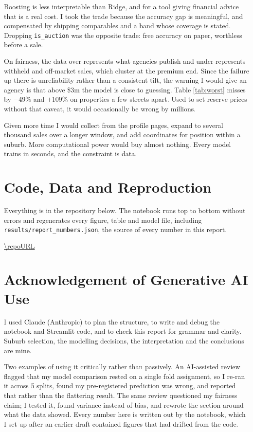 \documentclass[12pt,a4paper]{article}
\begin{document}
Boosting is less interpretable than Ridge, and for a tool giving financial advice that is a real
cost. I took the trade because the accuracy gap is meaningful, and compensated by shipping
comparables and a band whose coverage is stated. Dropping \texttt{is\_auction} was the opposite
trade: free accuracy on paper, worthless before a sale.

On fairness, the data over-represents what agencies publish and under-represents withheld and
off-market sales, which cluster at the premium end. Since the failure up there is unreliability
rather than a consistent tilt, the warning I would give an agency is that above \$3m the model is
close to guessing. Table \ref{tab:worst} misses by $-$49\% and $+$109\% on properties a few
streets apart. Used to set reserve prices without that caveat, it would occasionally be wrong by
millions.

Given more time I would collect from the profile pages, expand to several thousand sales over a
longer window, and add coordinates for position within a suburb. More computational power would
buy almost nothing. Every model trains in seconds, and the constraint is data.

\section{Code, Data and Reproduction}

Everything is in the repository below. The notebook runs top to bottom without errors and
regenerates every figure, table and model file, including
\texttt{results/report\_numbers.json}, the source of every number in this report.

\begin{center}
\url{\repoURL}
\end{center}

\section{Acknowledgement of Generative AI Use}

I used Claude (Anthropic) to plan the structure, to write and debug the notebook and Streamlit
code, and to check this report for grammar and clarity. Suburb selection, the modelling decisions,
the interpretation and the conclusions are mine.

Two examples of using it critically rather than passively. An AI-assisted review flagged that my
model comparison rested on a single fold assignment, so I re-ran it across 5 splits,
found my pre-registered prediction was wrong, and reported that rather than the flattering result.
The same review questioned my fairness claim; I tested it, found variance instead of bias, and
rewrote the section around what the data showed. Every number here is written out by the notebook,
which I set up after an earlier draft contained figures that had drifted from the code.
\end{document}
